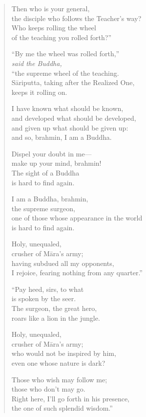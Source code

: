 \documentclass[12pt,openany]{book}%
\newcommand*{\scspeaker}[1]{\hspace{2em}\textit{#1}}
\begin{document}
\begin{verse}
Then who is your general, \\
the disciple who follows the Teacher’s way? \\
Who keeps rolling the wheel \\
of the teaching you rolled forth?” 

“By me the wheel was rolled forth,” \\
\scspeaker{said the Buddha, }\\
“the supreme wheel of the teaching. \\
\textsanskrit{Sāriputta}, taking after the Realized One, \\
keeps it rolling on. 

I have known what should be known, \\
and developed what should be developed, \\
and given up what should be given up: \\
and so, brahmin, I am a Buddha. 

Dispel your doubt in me—\\
make up your mind, brahmin! \\
The sight of a Buddha \\
is hard to find again. 

I am a Buddha, brahmin, \\
the supreme surgeon, \\
one of those whose appearance in the world \\
is hard to find again. 

Holy, unequaled, \\
crusher of \textsanskrit{Māra}’s army; \\
having subdued all my opponents, \\
I rejoice, fearing nothing from any quarter.” 

“Pay heed, sirs, to what \\
is spoken by the seer. \\
The surgeon, the great hero, \\
roars like a lion in the jungle. 

Holy, unequaled, \\
crusher of \textsanskrit{Māra}’s army; \\
who would not be inspired by him, \\
even one whose nature is dark? 

Those who wish may follow me; \\
those who don’t may go. \\
Right here, I’ll go forth in his presence, \\
the one of such splendid wisdom.” 


\end{verse}
\end{document}
